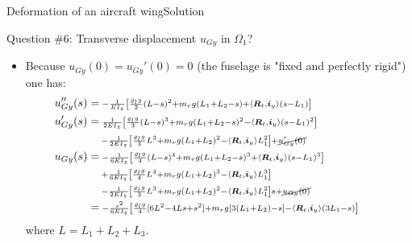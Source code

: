 \documentclass{beamer}
\newcommand{\uj}{u}
\newcommand{\yj}{y}
\newcommand{\zj}{z}
\renewcommand{\ij}{i}
\newcommand{\iv}{{\boldsymbol\ij}}
\newcommand{\medium}{\Omega}
\newcommand{\roi}{\varrho}
\newcommand{\Fresj}{R}
\newcommand{\Fres}{{\boldsymbol\Fresj}}
\newcommand{\scal}[1]{\left\langle{#1}\right\rangle}
\begin{document}
\begin{frame}{Deformation of an aircraft wing}{Solution}
\begin{overprint}
\vskip-20pt
\begin{exampleblock}{Question \#6: Transverse displacement $\uj_{G\yj}$ in $\medium_1$?}
\begin{itemize}
\item Because $\uj_{G\yj}(0)=\uj_{G\yj}'(0)=0$ (the fuselage is "fixed and perfectly rigid") one has:
\begin{displaymath}
\begin{split}
\!\!\!\!\!\!\!\!\!\!\!\!\!\uj_{G\yj}''(s) &= \scriptstyle\; -\frac{1}{EI_\zj}\left[\frac{\roi_l g}{2}(L-s)^2 +m_r g(L_1+L_2-s) + \scal{\Fres_t,\iv_\yj}(s-L_1)\right] \\
\!\!\!\!\!\!\!\!\!\!\!\!\!\uj_{G\yj}'(s) &= \scriptstyle\; \frac{1}{2EI_\zj}\left[\frac{\roi_l g}{3}(L-s)^3 +m_r g(L_1+L_2-s)^2 - \scal{\Fres_t,\iv_\yj}(s-L_1)^2\right] \\
& \scriptstyle\; \quad -\frac{1}{2EI_\zj}\left[\frac{\roi_l g}{3}L^3 +m_r g(L_1+L_2)^2 - \scal{\Fres_t,\iv_\yj}L_1^2\right] + \cancel{\uj_{G\yj}'(0)} \\
\!\!\!\!\!\!\!\!\!\!\!\!\!\uj_{G\yj}(s) &= \scriptstyle\; -\frac{1}{6EI_\zj}\left[\frac{\roi_l g}{4}(L-s)^4 +m_r g(L_1+L_2-s)^3 + \scal{\Fres_t,\iv_\yj}(s-L_1)^3\right] \\
& \scriptstyle\; \quad +\frac{1}{6EI_\zj}\left[\frac{\roi_l g}{4}L^4 +m_r g(L_1+L_2)^3 - \scal{\Fres_t,\iv_\yj}L_1^3\right]  \\
& \scriptstyle\; \quad -\frac{1}{2EI_\zj}\left[\frac{\roi_l g}{3}L^3 +m_r g(L_1+L_2)^2 - \scal{\Fres_t,\iv_\yj}L_1^2\right]s  + \cancel{\uj_{G\yj}(0)} \\
&=\scriptstyle\; -\frac{s^2}{6EI_\zj}\left[\frac{\roi_l g}{4}[6L^2-4Ls+s^2]+m_r g[3(L_1+L_2)-s]-\scal{\Fres_t,\iv_\yj}(3L_1-s)\right]
\end{split}
\end{displaymath}
where $L=L_1+L_2+L_3$.
\end{itemize}
\end{exampleblock}


\end{overprint}
\end{frame}
\end{document}
